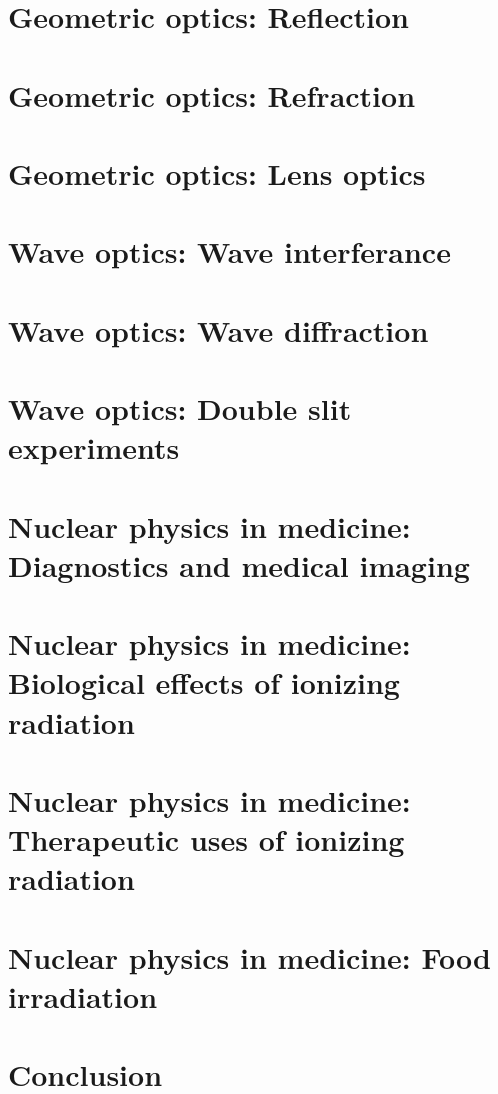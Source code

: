 \documentclass{beamer}
\begin{document}
\section{Geometric optics: Reflection}

\section{Geometric optics: Refraction}

\section{Geometric optics: Lens optics}

\section{Wave optics: Wave interferance}

\section{Wave optics: Wave diffraction}

\section{Wave optics: Double slit experiments}

\section{Nuclear physics in medicine: Diagnostics and medical imaging}

\section{Nuclear physics in medicine: Biological effects of ionizing radiation}

\section{Nuclear physics in medicine: Therapeutic uses of ionizing radiation}

\section{Nuclear physics in medicine: Food irradiation}

\section{Conclusion}
\end{document}
